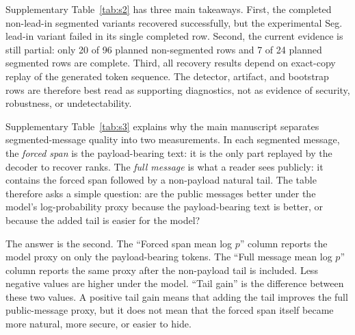 \documentclass[fleqn,10pt]{wlscirep}
\begin{document}
Supplementary Table~\ref{tab:s2} has three main takeaways. First, the completed non-lead-in segmented variants recovered successfully, but the experimental Seg. lead-in variant failed in its single completed row. Second, the current evidence is still partial: only 20 of 96 planned non-segmented rows and 7 of 24 planned segmented rows are complete. Third, all recovery results depend on exact-copy replay of the generated token sequence. The detector, artifact, and bootstrap rows are therefore best read as supporting diagnostics, not as evidence of security, robustness, or undetectability.




Supplementary Table~\ref{tab:s3} explains why the main manuscript separates segmented-message quality into two measurements. In each segmented message, the \emph{forced span} is the payload-bearing text: it is the only part replayed by the decoder to recover ranks. The \emph{full message} is what a reader sees publicly: it contains the forced span followed by a non-payload natural tail. The table therefore asks a simple question: are the public messages better under the model's log-probability proxy because the payload-bearing text is better, or because the added tail is easier for the model?

The answer is the second. The ``Forced span mean log \(p\)'' column reports the model proxy on only the payload-bearing tokens. The ``Full message mean log \(p\)'' column reports the same proxy after the non-payload tail is included. Less negative values are higher under the model. ``Tail gain'' is the difference between these two values. A positive tail gain means that adding the tail improves the full public-message proxy, but it does not mean that the forced span itself became more natural, more secure, or easier to hide.
\end{document}
